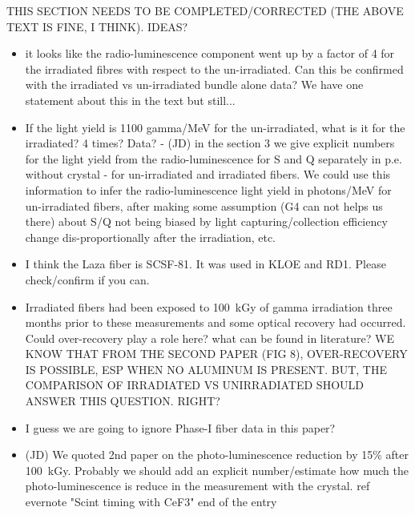 \documentclass[a4paper,11pt]{article}
\begin{document}
THIS SECTION NEEDS TO BE COMPLETED/CORRECTED (THE ABOVE TEXT IS FINE, I THINK).  IDEAS?

\begin{itemize}
    \item it looks like the radio-luminescence component went up by a factor of 4 for the irradiated fibres with respect to the un-irradiated.  Can this be confirmed with the irradiated vs un-irradiated bundle alone data?  We have one statement about this in the text but still...
    \item If the light yield is 1100 gamma/MeV for the un-irradiated, what is it for the irradiated?  4 times?  Data? - (JD) in the section 3 we give explicit numbers for the light yield from the radio-luminescence for S and Q separately in p.e. without crystal - for un-irradiated and irradiated fibers. We could use this information to infer the radio-luminescence light yield in photons/MeV for un-irradiated fibers, after making some assumption (G4 can not helps us there) about S/Q not being  biased by light capturing/collection efficiency change dis-proportionally after the irradiation, etc. 
    
    \item I think the Laza fiber is SCSF-81.  It was used in KLOE and RD1.  Please check/confirm if you can.
    \item Irradiated fibers had been exposed to 100~kGy of gamma irradiation three months prior to these measurements and some optical recovery had occurred. Could over-recovery play a role here? what can be found in literature?  WE KNOW THAT FROM THE SECOND PAPER (FIG 8), OVER-RECOVERY IS POSSIBLE, ESP WHEN NO ALUMINUM IS PRESENT.  BUT, THE COMPARISON OF IRRADIATED VS UNIRRADIATED SHOULD ANSWER THIS QUESTION.  RIGHT?
    \item I guess we are going to ignore Phase-I fiber data in this paper?
    \item (JD) We quoted 2nd paper on the photo-luminescence reduction by 15\% after 100~kGy. Probably we should add an explicit number/estimate how much the photo-luminescence is reduce in the measurement with the crystal. ref evernote "Scint timing with CeF3" end of the entry 
\end{itemize}
\end{document}
